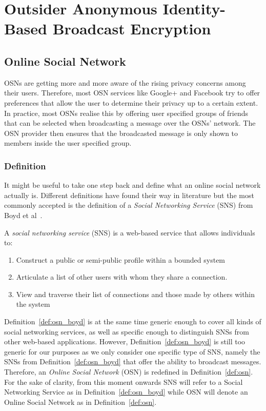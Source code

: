 \chapter{Outsider Anonymous Identity-Based Broadcast Encryption}
\label{cha:n}

\section{Online Social Network}
OSNs are getting more and more aware of the rising privacy concerns among their users. Therefore, most OSN services like Google+ and Facebook try to offer preferences that allow the user to determine their privacy up to a certain extent. In practice, most OSNs realise this by offering user specified groups of friends that can be selected when broadcasting a message over the OSNs' network. The OSN provider then ensures that the broadcasted message is only shown to members inside the user specified group.

\subsection{Definition}
It might be useful to take one step back and define what an online social network actually is. Different definitions have found their way in literature but the most commonly accepted is the definition of a \textit{Social Networking Service} (SNS) from Boyd et al~\cite{art:BoydE08}.

\begin{defn}
\label{def:osn_boyd}
 A \textit{social networking service} (SNS) is a web-based service that allows individuals to:
 \begin{enumerate}
  \item Construct a public or semi-public profile within a bounded system
  \item Articulate a list of other users with whom they share a connection.
  \item View and traverse their list of connections and those made by others within the system
  \setcounter{enumTemp}{\theenumi}
 \end{enumerate}
\end{defn}

Definition~\ref{def:osn_boyd} is at the same time generic enough to cover all kinds of social networking services, as well as specific enough to distinguish SNSs from other web-based applications. However, Definition~\ref{def:osn_boyd} is still too generic for our purposes as we only consider one specific type of SNS, namely the SNSs from Definition~\ref{def:osn_boyd} that offer the ability to broadcast messages. Therefore, an \textit{Online Social Network} (OSN) is redefined in Definition~\ref{def:osn}. For the sake of clarity, from this moment onwards SNS will refer to a Social Networking Service as in Definition~\ref{def:osn_boyd} while OSN will denote an Online Social Network as in Definition~\ref{def:osn}.


